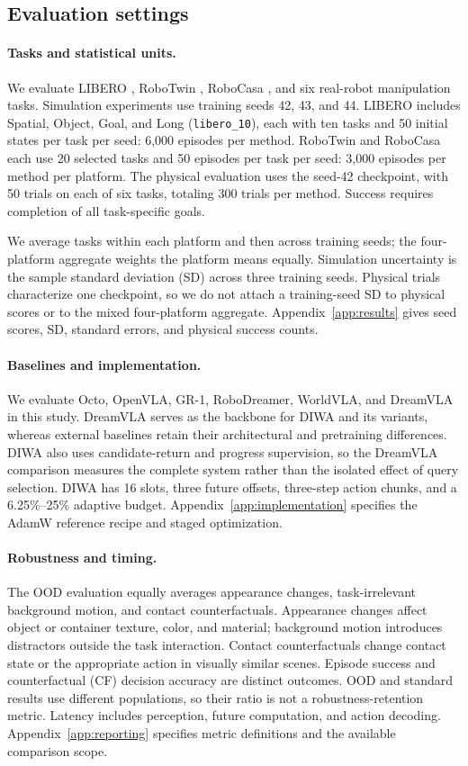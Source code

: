 \documentclass{article}
\begin{document}
\subsection{Evaluation settings}
\paragraph{Tasks and statistical units.}
We evaluate LIBERO \citep{liu2023libero}, RoboTwin \citep{mu2025robotwin}, RoboCasa \citep{nasiriany2024robocasa}, and six real-robot manipulation tasks. Simulation experiments use training seeds 42, 43, and 44. LIBERO includes Spatial, Object, Goal, and Long (\texttt{libero\_10}), each with ten tasks and 50 initial states per task per seed: 6,000 episodes per method. RoboTwin and RoboCasa each use 20 selected tasks and 50 episodes per task per seed: 3,000 episodes per method per platform. The physical evaluation uses the seed-42 checkpoint, with 50 trials on each of six tasks, totaling 300 trials per method. Success requires completion of all task-specific goals.

We average tasks within each platform and then across training seeds; the four-platform aggregate weights the platform means equally. Simulation uncertainty is the sample standard deviation (SD) across three training seeds. Physical trials characterize one checkpoint, so we do not attach a training-seed SD to physical scores or to the mixed four-platform aggregate. Appendix~\ref{app:results} gives seed scores, SD, standard errors, and physical success counts.

\paragraph{Baselines and implementation.}
We evaluate Octo, OpenVLA, GR-1, RoboDreamer, WorldVLA, and DreamVLA in this study. DreamVLA serves as the backbone for DIWA and its variants, whereas external baselines retain their architectural and pretraining differences. DIWA also uses candidate-return and progress supervision, so the DreamVLA comparison measures the complete system rather than the isolated effect of query selection. DIWA has 16 slots, three future offsets, three-step action chunks, and a 6.25\%--25\% adaptive budget. Appendix~\ref{app:implementation} specifies the AdamW reference recipe and staged optimization.

\paragraph{Robustness and timing.}
The OOD evaluation equally averages appearance changes, task-irrelevant background motion, and contact counterfactuals. Appearance changes affect object or container texture, color, and material; background motion introduces distractors outside the task interaction. Contact counterfactuals change contact state or the appropriate action in visually similar scenes. Episode success and counterfactual (CF) decision accuracy are distinct outcomes. OOD and standard results use different populations, so their ratio is not a robustness-retention metric. Latency includes perception, future computation, and action decoding. Appendix~\ref{app:reporting} specifies metric definitions and the available comparison scope.
\end{document}
